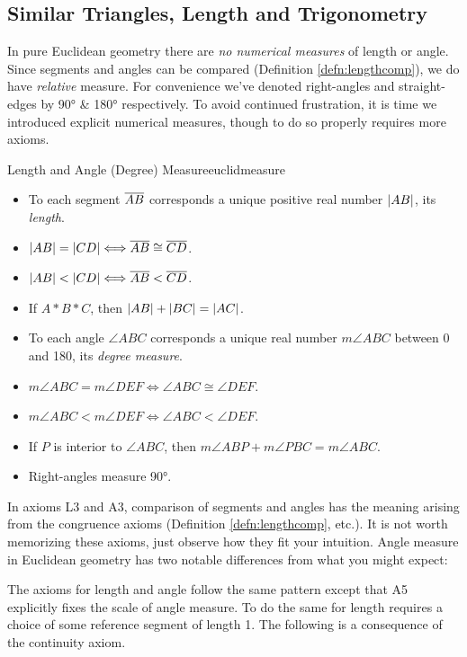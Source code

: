 \clearpage




\subsection{Similar Triangles, Length and Trigonometry}\label{sec:similar}

In pure Euclidean geometry there are \emph{no numerical measures} of length or angle. Since segments and angles can be compared (Definition \ref{defn:lengthcomp}), we do have \emph{relative} measure. For convenience we've denoted right-angles and straight-edges by \ang{90} \& \ang{180} respectively. To avoid continued frustration, it is time we introduced explicit numerical measures, though to do so properly requires more axioms.

\begin{axioms}{Length and Angle (Degree) Measure}{euclidmeasure}
	\begin{itemize}
		\item[L1] To each segment $\overline{AB}$ corresponds a unique positive real number $\left| AB\right|$, its \emph{length}.
		\item[L2] $\left| AB\right|=\left| CD\right|\Longleftrightarrow \overline{AB}\cong\overline{CD}$.
		\item[L3] $\left| AB\right|<\left| CD\right|\Longleftrightarrow\overline{AB}<\overline{CD}$.
		\item[L4] If $A*B*C$, then $\left| AB\right|+\left| BC\right|=\left| AC\right|$.
		\item[A1] To each angle $\angle ABC$ corresponds a unique real number $m\angle ABC$ between 0 and 180, its  \emph{degree measure}.
		\item[A2] $m\angle ABC=m\angle DEF\Longleftrightarrow\angle ABC\cong\angle DEF$.
		\item[A3] $m\angle ABC<m\angle DEF\Longleftrightarrow\angle ABC<\angle DEF$.
	  \item[A4] If $P$ is interior to $\angle ABC$, then $m\angle ABP+m\angle PBC=m\angle ABC$.
	  \item[A5] Right-angles measure \ang{90}.
	\end{itemize}
\end{axioms}

In axioms L3 and A3, comparison of segments and angles has the meaning arising from the congruence axioms (Definition \ref{defn:lengthcomp}, etc.). It is not worth memorizing these axioms, just observe how they fit your intuition. Angle measure in Euclidean geometry has two notable differences from what you might expect:
The axioms for length and angle follow the same pattern except that A5 explicitly fixes the scale of angle measure. To do the same for length requires a choice of some reference segment of length 1. The following is a consequence of the continuity axiom.


